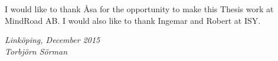 \begin{acknowledgments}
  I would like to thank Åsa for the opportunity to make this Thesis work at MindRoad AB. I would also like to thank Ingemar and Robert at ISY.

  \addvspace{1em}
  \begin{flushright}
    \textit{%
      Linköping, December 2015\\
      Torbjörn Sörman%
    }
  \end{flushright}
\end{acknowledgments}
